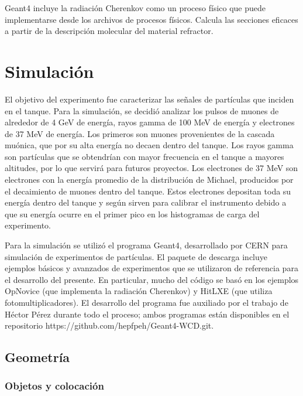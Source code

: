 \documentclass{book}
\begin{document}
Geant4 incluye la radiaci\'on Cherenkov como un proceso f\'isico que puede implementarse desde los archivos de procesos f\'isicos. Calcula las secciones eficaces a partir de la descripci\'on molecular del material refractor. 



\section{Simulaci\'on}
El objetivo del experimento fue caracterizar las se\~nales de part\'iculas que inciden en el tanque. Para la simulaci\'on, se decidi\'o analizar los pulsos de muones de alrededor de 4 GeV de energ\'ia, rayos gamma de 100 MeV de energ\'ia y electrones de 37 MeV de energ\'ia. Los primeros son muones provenientes de la cascada mu\'onica, que por su alta energ\'ia no decaen dentro del tanque. Los rayos gamma son part\'iculas que se obtendr\'ian con mayor frecuencia en el tanque a mayores altitudes, por lo que servir\'a para futuros proyectos. Los electrones de 37 MeV son electrones con la energ\'ia promedio de la distribuci\'on de Michael, producidos por el decaimiento de muones dentro del tanque. Estos electrones depositan toda su energ\'ia dentro del tanque y seg\'un \citep{ALLISON} sirven para calibrar el instrumento debido a que su energ\'ia ocurre en el primer pico en los histogramas de carga del experimento.

Para la simulaci\'on se utiliz\'o el programa Geant4, desarrollado por CERN para simulaci\'on de experimentos de part\'iculas. El paquete de descarga incluye ejemplos b\'asicos y avanzados de experimentos que se utilizaron de referencia para el desarrollo del presente. En particular, mucho del c\'odigo se bas\'o en los ejemplos OpNovice (que implementa la radiaci\'on Cherenkov) y HitLXE (que utiliza fotomultiplicadores). El desarrollo del programa fue auxiliado por el trabajo de H\'ector P\'erez durante todo el proceso; ambos programas est\'an disponibles en el repositorio https://github.com/hepfpeh/Geant4-WCD.git.
\subsection{Geometr\'ia}
\subsubsection{Objetos y colocaci\'on}
\end{document}
